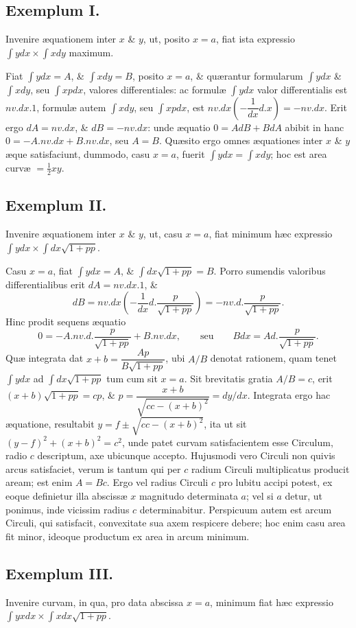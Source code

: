 \subsection*{Exemplum I.}
Invenire æquationem inter $x$ \& $y$, ut, posito $x=a$, fiat ista expressio $\int ydx\times\int xdy$ maximum.

Fiat $\int ydx=A$, \& $\int xdy=B$, posito $x=a$, \& quærantur formularum $\int ydx$ \& $\int xdy$, seu $\int xpdx$, valores differentiales: ac formulæ $\int ydx$ valor differentialis est $nv.dx.1$, formulæ autem $\int xdy$, seu $\int xpdx$, est $nv.dx\left(-\dfrac{1}{dx}d.x\right)=-nv.dx$. Erit ergo $dA=nv.dx$, \& $dB=-nv.dx$: unde æquatio $0=AdB+BdA$ abibit in hanc $0=-A.nv.dx+B.nv.dx$, seu $A=B$. Quæsito ergo omnes æquationes inter $x$ \& $y$ æque satisfaciunt, dummodo, casu $x=a$, fuerit $\int ydx=\int xdy$; hoc est area curvæ $=\tfrac12xy$.
\subsection*{Exemplum II.}
Invenire æquationem inter $x$ \& $y$, ut, casu $x=a$, fiat minimum hæc expressio $\int ydx\times\int dx\sqrt{1+pp}$.

Casu $x=a$, fiat $\int ydx=A$, \& $\int dx\sqrt{1+pp}=B$. Porro sumendis valoribus differentialibus erit $dA=nv.dx.1$, \&
\[dB=nv.dx\left(-\frac{1}{dx}d.\frac{p}{\sqrt{1+pp}}\right)=-nv.d.\frac{p}{\sqrt{1+pp}}.\]
Hinc prodit sequens æquatio
\[0=-A.nv.d.\frac{p}{\sqrt{1+pp}}+B.nv.dx,\qquad\text{seu}\qquad Bdx=Ad.\frac{p}{\sqrt{1+pp}}.\]
Quæ integrata dat $x+b=\dfrac{Ap}{B\sqrt{1+pp}}$, ubi $A/B$ denotat rationem, quam tenet $\int ydx$ ad $\int dx\sqrt{1+pp}$ tum cum sit $x=a$. Sit brevitatis gratia $A/B=c$, erit $(x+b)\sqrt{1+pp}=cp$, \& $p=\dfrac{x+b}{\sqrt{cc-(x+b)^2}}=dy/dx$. Integrata ergo hac æquatione,
resultabit $y=f\pm\sqrt{cc-(x+b)^2}$, ita ut sit $(y-f)^2+(x+b)^2=c^2$, unde patet curvam satisfacientem esse Circulum, radio $c$ descriptum, axe ubicunque accepto. Hujusmodi vero Circuli non quivis arcus satisfaciet, verum is tantum qui per $c$ radium Circuli multiplicatus producit aream; est enim $A=Bc$. Ergo vel radius Circuli $c$ pro lubitu accipi potest, ex eoque definietur illa abscissæ $x$ magnitudo determinata $a$; vel si $a$ detur, ut ponimus, inde vicissim radius $c$ determinabitur. Perspicuum autem est arcum Circuli, qui satisfacit, convexitate sua axem respicere debere; hoc enim casu area fit minor, ideoque productum ex area in arcum minimum.
\subsection*{Exemplum III.}
Invenire curvam, in qua, pro data abscissa $x=a$, minimum fiat hæc expressio $\int yxdx\times\int xdx\sqrt{1+pp}$.

